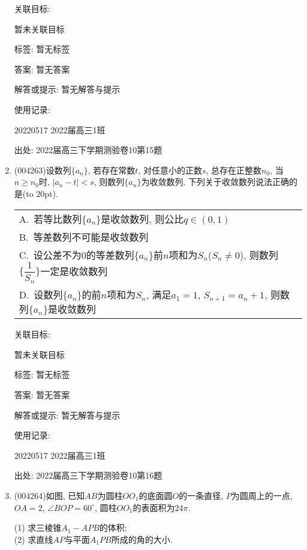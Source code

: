 \documentclass[10pt,a4paper]{article}
\newcommand{\bracket}[1]{(\hbox to #1pt{})}
\newcommand{\onech}[4]{\par\begin{tabular}{p{.9\textwidth}}
A.~#1\\
B.~#2\\
C.~#3\\
D.~#4
\end{tabular}}
\begin{document}
\begin{enumerate}[1.]
关联目标:

暂未关联目标



标签: 暂无标签

答案: 暂无答案

解答或提示: 暂无解答与提示

使用记录:

20220517	2022届高三1班	


出处: 2022届高三下学期测验卷10第15题
\item { (004263)}设数列$\{a_n\}$, 若存在常数$t$, 对任意小的正数$s$, 总存在正整数$n_0$, 当$n\ge n_0$时, $|a_n-t|<s$, 则数列$\{a_n\}$为收敛数列. 下列关于收敛数列说法正确的是\bracket{20}.
\onech{若等比数列$\{a_n\}$是收敛数列, 则公比$q\in (0,1)$}{等差数列不可能是收敛数列}{设公差不为$0$的等差数列$\{a_n\}$前$n$项和为$S_n$($S_n\ne 0$), 则数列$\{\dfrac 1{S_n}\}$一定是收敛数列}{设数列$\{a_n\}$的前$n$项和为$S_n$, 满足$a_1=1$, ${S_{n+1}}=a_n+1$, 则数列$\{a_n\}$是收敛数列}


关联目标:

暂未关联目标



标签: 暂无标签

答案: 暂无答案

解答或提示: 暂无解答与提示

使用记录:

20220517	2022届高三1班	


出处: 2022届高三下学期测验卷10第16题
\item { (004264)}如图, 已知$AB$为圆柱$OO_1$的底面圆$O$的一条直径, $P$为圆周上的一点, $OA=2$, $\angle BOP=60^{\circ}$, 圆柱$OO_1$的表面积为$24\pi$.
\begin{center}
\end{center}
(1) 求三棱锥$A_1-APB$的体积;\\
(2) 求直线$AP$与平面$A_1PB$所成的角的大小.



\end{enumerate}
\end{document}
